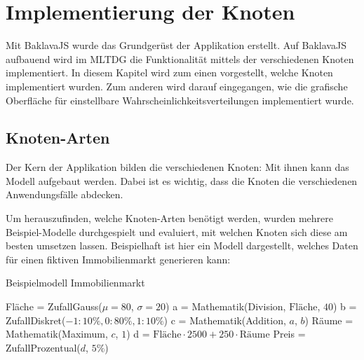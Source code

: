 
\chapter{Implementierung der Knoten}

Mit BaklavaJS wurde das Grundgerüst der Applikation erstellt. Auf BaklavaJS aufbauend wird im \ac{MLTDG} die Funktionalität mittels der verschiedenen Knoten implementiert. In diesem Kapitel wird zum einen vorgestellt, welche Knoten implementiert wurden. Zum anderen wird darauf eingegangen, wie die grafische Oberfläche für einstellbare Wahrscheinlichkeitsverteilungen implementiert wurde.

\section{Knoten-Arten}
Der Kern der Applikation bilden die verschiedenen Knoten: Mit ihnen kann das Modell aufgebaut werden. Dabei ist es wichtig, dass die Knoten die verschiedenen Anwendungsfälle abdecken.

Um herauszufinden, welche Knoten-Arten benötigt werden, wurden mehrere Beispiel-Modelle durchgespielt und evaluiert, mit welchen Knoten sich diese am besten umsetzen lassen. Beispielhaft ist hier ein Modell dargestellt, welches Daten für einen fiktiven Immobilienmarkt generieren kann:
\begin{algorithm}[H]
    \caption{Beispielmodell Immobilienmarkt}
    \begin{algorithmic}[1]
        \State Fläche = ZufallGauss($\mu = 80$, $\sigma = 20$)
        \State a = Mathematik(Division, $\textrm{Fläche}$, $40$)
        \State b = ZufallDiskret($-1: 10\%, 0: 80\%, 1: 10\%$)
        \State c = Mathematik(Addition, $a$, $b$)
        \State Räume = Mathematik(Maximum, $c$, $1$)
        \State d = $\textrm{Fläche} \cdot 2500 + 250 \cdot \textrm{Räume}$
        \State Preis = ZufallProzentual($d$, $5\%$)
    \end{algorithmic}
\end{algorithm}

